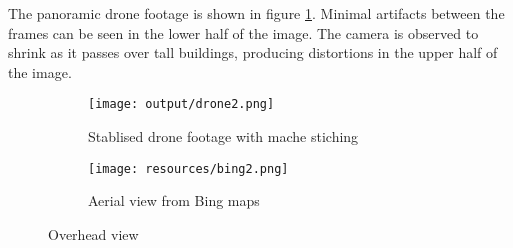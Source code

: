 The panoramic drone footage is shown in figure \ref{fig:drone}.
Minimal artifacts between the frames can be seen in the lower half of the image.
The camera is observed to shrink as it passes over tall buildings,
producing distortions in the upper half of the image.

\begin{figure}
  \centering
  \begin{subfigure}[b]{0.7\textwidth}
    \texttt{[image: output/drone2.png]}
    \caption{Stablised drone footage with mache stiching}
    \label{fig:drone}
  \end{subfigure}
  \begin{subfigure}[b]{0.7\textwidth}
    \texttt{[image: resources/bing2.png]}
    \caption{Aerial view from Bing maps}
    \label{fig:bing}
  \end{subfigure}
	\caption{Overhead view}
\end{figure}

